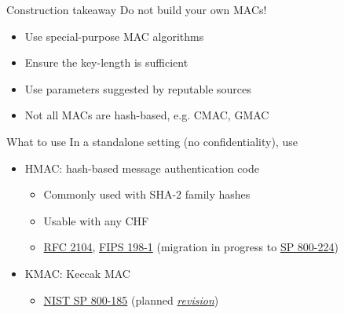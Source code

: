 \begin{frame}{Construction takeaway}
  Do not build your own MACs!
  \begin{itemize}[<+(1)->]
    \item Use special-purpose MAC algorithms
    \item Ensure the key-length is sufficient
    \item Use parameters suggested by reputable sources
    \item Not all MACs are hash-based, e.g. CMAC, GMAC
  \end{itemize}
\end{frame}

\begin{frame}{What to use}
  In a standalone setting (no confidentiality), use
  \begin{itemize}[<+(1)->]
    \item HMAC: hash-based message authentication code
    \begin{itemize}
      \item Commonly used with SHA-2 family hashes
      \item Usable with any CHF
      \item \href{https://datatracker.ietf.org/doc/html/rfc2104}{RFC 2104}, \href{https://csrc.nist.gov/pubs/fips/198-1/final}{FIPS 198-1} (migration in progress to \href{https://csrc.nist.gov/pubs/sp/800/224/ipd}{SP 800-224})
    \end{itemize}
    \item KMAC: Keccak MAC
    \begin{itemize}
      \item \href{https://csrc.nist.gov/pubs/sp/800/185/final}{NIST SP 800-185} (planned \href{https://csrc.nist.gov/news/2025/decision-to-update-fips-202-and-revise-sp-800-185}{\textit{revision}})
    \end{itemize}
  \end{itemize}
\end{frame}

